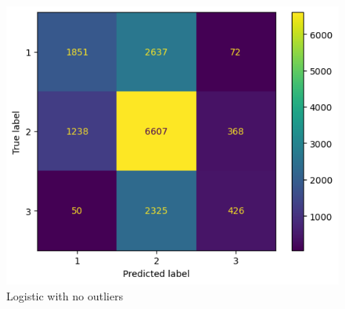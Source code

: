 \documentclass[twocolumn]{article}
\begin{document}
\begin{figure}
    \centering
    \includegraphics[width=0.65\columnwidth]{logisticNoOutliers.png}
    \caption{Logistic with no outliers}
\end{figure}


\clearpage
\end{document}
